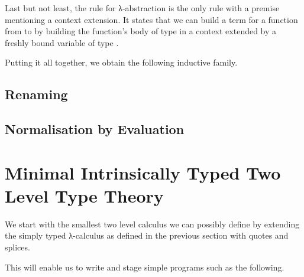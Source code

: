 \documentclass{article}
\begin{document}
Last but not least, the rule for λ-abstraction is the only rule
with a premise mentioning a context extension. It states that
we can build a term for a function from  to  by
building the function's body of type  in a context extended
by a freshly bound variable of type .

\noindent
\begin{minipage}[t]{.5\textwidth}
\end{minipage}\hfill
\begin{minipage}[t]{.35\textwidth}
\begin{mathpar}
\end{mathpar}
\end{minipage}


Putting it all together, we obtain the following inductive family.

\begin{AgdaAlign}
\begin{AgdaSuppressSpace}
\end{AgdaSuppressSpace}
\end{AgdaAlign}

\subsection{Renaming}



\subsection{Normalisation by Evaluation}


\section{Minimal Intrinsically Typed Two Level Type Theory}

We start with the smallest two level calculus we can possibly define
by extending the simply typed λ-calculus as defined in the previous
section with quotes and splices.

This will enable us to write and stage simple programs such as the following.
\end{document}
